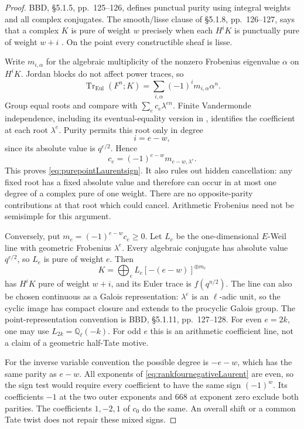 \begin{proof}
BBD, \S5.1.5, pp.~125--126, defines punctual purity using
integral weights and all complex conjugates.
The smooth/lisse clause of \S5.1.8, pp.~126--127, says that
a complex \(K\) is pure of weight \(w\) precisely when
each \(H^iK\) is punctually pure of weight \(w+i\)
\cite{BBD}. On the point every constructible sheaf is lisse.

Write \(m_{i,\alpha}\) for the algebraic multiplicity of
the nonzero Frobenius eigenvalue \(\alpha\) on \(H^iK\).
Jordan blocks do not affect power traces, so
\[
 \operatorname{Tr}_{\mathrm{Eul}}(F^n;K)
      =\sum_{i,\alpha}(-1)^i m_{i,\alpha}\alpha^n.
\]
Group equal roots and compare with
\(\sum_e c_e\lambda^{en}\).
Finite Vandermonde independence, including its
eventual-equality version in , identifies the
coefficient at each root \(\lambda^e\).
Purity permits this root only in degree
\[
                            i=e-w,
\]
since its absolute value is \(q^{e/2}\). Hence
\[
                    c_e=(-1)^{e-w}m_{e-w,\lambda^e}.
\]
This proves \eqref{eq:purepointLaurentsign}.
It also rules out hidden cancellation: any fixed root
has a fixed absolute value and therefore can occur in at
most one degree of a complex pure of one weight.
There are no opposite-parity contributions at that root
which could cancel. Arithmetic Frobenius need not be
semisimple for this argument.

Conversely, put \(m_e=(-1)^{e-w}c_e\ge0\).
Let \(L_e\) be the one-dimensional \(E\)-Weil line with
geometric Frobenius \(\lambda^e\). Every algebraic conjugate
has absolute value \(q^{e/2}\), so \(L_e\) is pure of
weight \(e\). Then
\begin{equation}\label{eq:purepointLaurentconstruction}
           K=\bigoplus_e L_e[-(e-w)]^{\oplus m_e}
\end{equation}
has \(H^iK\) pure of weight \(w+i\), and its Euler trace
is \(f(q^{n/2})\). The line can also be chosen continuous
as a Galois representation: \(\lambda^e\) is an
\(\ell\)-adic unit, so the cyclic image has compact
closure and extends to the procyclic Galois group.
The point-representation convention is BBD,
\S5.1.11, pp.~127--128.
For even \(e=2k\), one may use
\(L_{2k}=\mathbb Q_\ell(-k)\).
For odd \(e\) this is an arithmetic coefficient line,
not a claim of a geometric half-Tate motive.

For the inverse variable convention the possible degree
is \(-e-w\), which has the same parity as \(e-w\).
All exponents of \eqref{eq:rankfournegativeLaurent}
are even, so the sign test would require every coefficient
to have the same sign \((-1)^w\).
Its coefficients \(-1\) at the two outer exponents and
\(668\) at exponent zero exclude both parities.
The coefficients \(1,-2,1\) of \(c_0\) do the same.
An overall shift or a common Tate twist does not repair
these mixed signs.
\end{proof}

